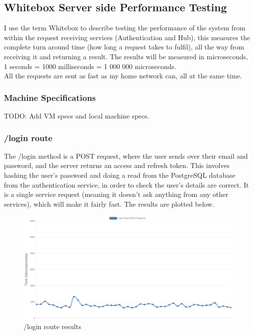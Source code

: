 \documentclass[titlepage]{article}
\begin{document}
\subsection{Whitebox Server side Performance Testing}
I use the term Whitebox to describe testing the performance of the system from within the request receiving services (Authentication and Hub), this measures the complete turn around time (how long a request takes to fulfil), all the way from receiving it and returning a result. The results will be measured in microseconds, 1 seconds = 1000 milliseconds = 1 000 000 microseconds. \\

All the requests are sent as fast as my home network can, all at the same time.

\subsubsection{Machine Specifications}
TODO: Add VM specs and local machine specs.

\pagebreak
\subsubsection{/login route}
The /login method is a POST request, where the user sends over their email and password, and the server returns an access and refresh token. This involves hashing the user's password and doing a read from the PostgreSQL database from the authentication service, in order to check the user's details are correct. It is a single service request (meaning it doesn't ask anything from any other services), which will make it fairly fast. The results are plotted below.

\begin{figure}[h!]
\includegraphics[width=\textwidth]{../results/login.png}
  \caption{/login route results}
\end{figure}
\end{document}
